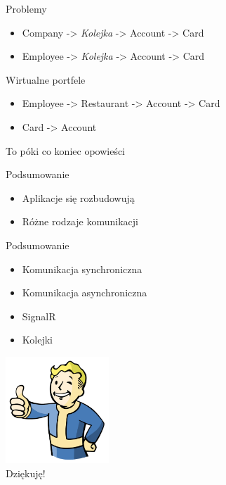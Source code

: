 \documentclass{beamer}
\begin{document}
\begin{frame}{Problemy}
	\begin{huge}
		\begin{itemize}[<+->]
			\item Company -> \textit{Kolejka} -> Account -> Card
			\item Employee -> \textit{Kolejka} -> Account -> Card
		\end{itemize}
	\end{huge}
\end{frame}

\begin{frame}{Wirtualne portfele}
	\begin{huge}
		\begin{itemize}[<+->]
			\item Employee -> Restaurant -> Account -> Card
			\item Card -> Account
		\end{itemize}
	\end{huge}
\end{frame}


\begin{frame}{}
	\begin{center}
		\Huge{To póki co koniec opowieści}
	\end{center}
\end{frame}

\begin{frame}{Podsumowanie}
	\begin{huge}
		\begin{itemize}[<+->]
			\item Aplikacje się rozbudowują
			\item Różne rodzaje komunikacji
		\end{itemize}
	\end{huge}
\end{frame}

\begin{frame}{Podsumowanie}
	\begin{huge}
		\begin{itemize}[<+->]
			\item Komunikacja synchroniczna
			\item Komunikacja asynchroniczna
			\item SignalR
			\item Kolejki
		\end{itemize}
	\end{huge}
\end{frame}

\begin{frame}{}
	\begin{center}
  		\includegraphics[height=4cm]{ok.png} \\
		\Huge{Dziękuję!}
	\end{center}
\end{frame}
\end{document}
